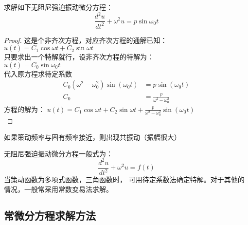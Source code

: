 \begin{example} %
	求解如下无阻尼强迫振动微分方程：
	\begin{equation*}
		\frac{d^2 u}{d t^2} + \omega ^2 u = p  \sin \omega_0 t 
	\end{equation*}
	\begin{proof} 
		这是个非齐次方程，对应齐次方程的通解已知：\\
        $u(t)=C_1 \cos \omega t +C_2 \sin \omega t $ \\
        只要求出一个特解就行，设非齐次方程的特解为：\\
           $ u(t) =C_0 \sin \omega_0 t $ \\
         代入原方程求待定系数
		\begin{align*}
		C_0(\omega^2-\omega_{0} ^2 ) \sin(\omega_0 t)& =p\sin(\omega_0 t)\\
		C_0 & = \frac{p}{\omega^2-\omega_{0} ^2 }
		\end{align*}
		方程的解为： $ u(t)= C_1 \cos \omega t +C_2 \sin \omega t+ \frac{p}{\omega^2-\omega_{0} ^2 } \sin (\omega_0 t) $ \\
	\end{proof}
\end{example}

\begin{remark}
	如果策动频率与固有频率接近，则出现共振动（振幅很大）
\end{remark}


\begin{note}
无阻尼强迫振动微分方程一般式为：
	\begin{equation*}
	\frac{d^2 u}{d t^2} + \omega ^2 u = f(t)
\end{equation*}
当策动函数为多项式函数，三角函数时， 可用待定系数法确定特解。对于其他的情况，一般常采用常数变易法求解。
\end{note}

\subsection{常微分方程求解方法}
